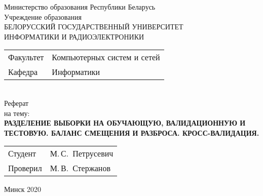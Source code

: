 \begin{titlepage}
  \begin{center}
    Министерство образования Республики Беларусь\\[1em]
    Учреждение образования\\
    БЕЛОРУССКИЙ ГОСУДАРСТВЕННЫЙ УНИВЕРСИТЕТ \\
    ИНФОРМАТИКИ И РАДИОЭЛЕКТРОНИКИ\\[1em]

    \begin{minipage}{\textwidth}
      \begin{flushleft}
        \begin{tabular}{ l l }
          Факультет & Компьютерных систем и сетей\\
          Кафедра   & Информатики
        \end{tabular}
      \end{flushleft}
    \end{minipage}\\[1em]


    {Реферат}\\
    {на тему:}\\[1em]
    \textbf{\large \MakeUppercase{Разделение выборки на обучающую, валидационную и тестовую. Баланс смещения и разброса. Кросс-валидация.}}\\[1em]


    \vfill
    \begin{tabular}{ p{}p{} }
      Студент & М.\,С.~Петрусевич \\
      Проверил & М.\,В.~Стержанов \\
    \end{tabular}
    
    \vfill
    {\normalsize Минск 2020}
  \end{center}
\end{titlepage}
